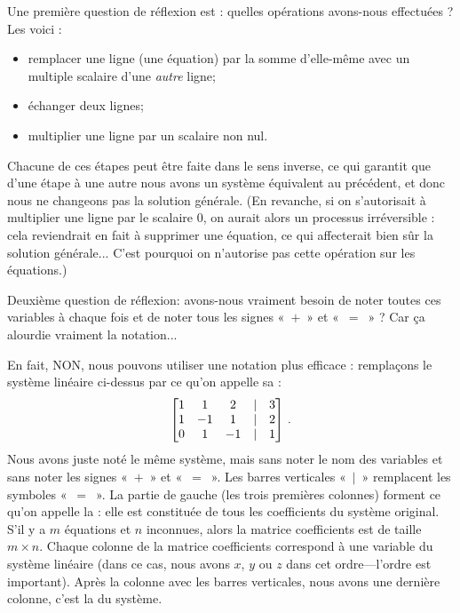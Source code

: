 Une premi\`ere question de réflexion est : quelles opérations avons-nous effectuées ? Les voici :
\begin{itemize}
\item remplacer une ligne (une \'equation) par la somme d'elle-même avec un multiple scalaire d'une \emph{autre} ligne;
\item échanger deux lignes;
\item multiplier une ligne par un scalaire non nul.\\
\end{itemize}

Chacune de ces étapes peut être faite dans le sens inverse, ce qui garantit que d'une étape à une autre nous avons un système équivalent au précédent, et donc
nous ne changeons pas la solution générale.  (En revanche, si on s'autorisait à  multiplier une ligne par le scalaire $0$,
on aurait alors un processus irréversible : cela reviendrait en fait à supprimer
une équation, ce qui affecterait bien s\^ur la solution générale... C'est pourquoi on n'autorise pas cette opération sur les équations.)


Deuxième question de réflexion:  avons-nous vraiment besoin de noter toutes ces variables à chaque fois et de noter tous les signes «~$+$~» et «~$=$~» ? Car ça alourdie vraiment la notation...

En fait, NON, nous pouvons utiliser une notation plus efficace : remplaçons le système linéaire ci-dessus par ce qu'on appelle sa  :
$$
\left[ \begin{matrix} 1 & 1 & 2 & | & 3\\
1 & -1 & 1 & | & 2\\
0 & 1 & -1 & | & 1 \end{matrix} \right]\,.
$$
Nous avons juste noté le même système, mais sans noter le nom des variables et sans noter les signes «~$+$~» et «~$=$~». Les barres verticales «~$|$~» remplacent les symboles «~$=$~».
La partie de gauche (les trois premières colonnes) forment ce qu'on appelle la : elle
est constituée de tous les coefficients du système original.
S'il y a $m$ équations et $n$ inconnues, alors la matrice coefficients est de taille $m\times n$.  Chaque colonne de la matrice coefficients correspond à une variable du système linéaire (dans ce cas, nous avons $x$, $y$ ou $z$ dans cet ordre---l'ordre est important).
Après la colonne avec les barres verticales, nous avons une dernière colonne, c'est la  du système.

